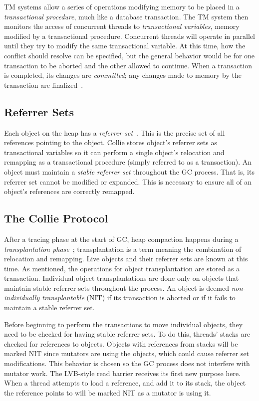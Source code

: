 \documentclass{sig-alternate}
\begin{document}
TM systems allow a series
of operations modifying memory to be placed in
a \emph{transactional procedure}, much like a database transaction.
The TM system then monitors the access of concurrent threads to \emph{transactional variables},
memory modified by a transactional procedure.
Concurrent threads will operate in parallel until they try to modify
the same transactional variable. At this time, how 
the conflict should resolve can be specified, but the general behavior would be for one transaction
to be aborted and the other allowed to continue.
When a transaction is completed, its changes are \emph{committed}; any changes 
made to memory by the transaction are finalized~\cite{wiki:transactional-memory}.


\subsection{Referrer Sets}
\label{sec:collieReferrerSets}

Each object on the heap has a \emph{referrer set}~\cite{Iyengar:Collie}. This is the precise set 
of all references pointing to the object. Collie stores object's referrer sets as transactional variables
so it can perform a single object's relocation and remapping as a transactional procedure 
(simply referred to as a transaction).
An object must maintain a \emph{stable referrer set} throughout the GC process. That is,
its referrer set cannot be modified or expanded. This is necessary to ensure all of an object's references
are correctly remapped.


\subsection{The Collie Protocol}
\label{sec:collieProtocol}

After a tracing phase at the start of GC, heap compaction
happens during a \emph{transplantation phase}~\cite{Iyengar:Collie};
transplantation is a term meaning the combination of relocation and remapping.
Live objects and their referrer sets are known at this time. As mentioned, 
the operations for object transplantation are stored as a
transaction. Individual object transplantations are done only on objects 
that maintain stable referrer sets throughout the process.
An object is deemed \emph{non-individually transplantable} (NIT) if its transaction
is aborted or if it fails to maintain a stable referrer set. 

Before beginning to perform the transactions to move individual objects, they
need to be checked for having stable referrer sets. To do this, threads' stacks
are checked for references to objects. Objects with references from stacks
will be marked NIT since mutators are using the objects, which could cause referrer set modifications.
This behavior is chosen so the GC process does not interfere with mutator work.
The LVB-style read barrier receives its first new purpose here. When a thread attempts to load a reference,
and add it to its stack, the object the reference points to will be marked NIT as a mutator is using it.
\end{document}

